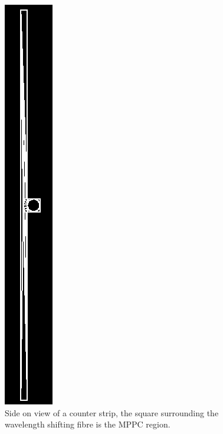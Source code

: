 \begin{figure}[h]
  \centering
    \includegraphics[scale=0.5]{images/Geometry/full_strip.png}
  \caption{Side on view of a counter strip, the square surrounding the wavelength shifting fibre is the MPPC region. }
  \label{fig:images_Geometry_full_strip}
\end{figure}

